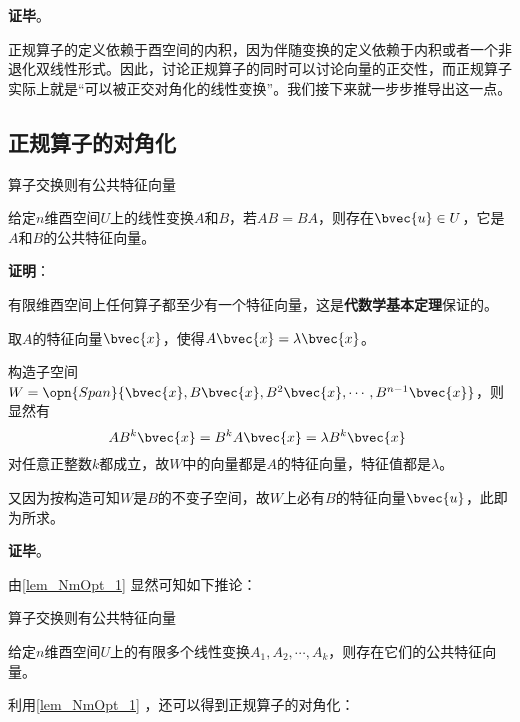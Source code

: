 \textbf{证毕}。




正规算子的定义依赖于酉空间的内积，因为伴随变换的定义依赖于内积或者一个非退化双线性形式。因此，讨论正规算子的同时可以讨论向量的正交性，而正规算子实际上就是“可以被正交对角化的线性变换”。我们接下来就一步步推导出这一点。





\subsection{正规算子的对角化}



\begin{lemma}{算子交换则有公共特征向量}\label{lem_NmOpt_1}

给定$n$维酉空间$U$上的线性变换$A$和$B$，若$AB=BA$，则存在$\bvec{u}\in U$，它是$A$和$B$的公共特征向量。

\end{lemma}


\textbf{证明}：

有限维酉空间上任何算子都至少有一个特征向量，这是\textbf{代数学基本定理}保证的。

取$A$的特征向量$\bvec{x}$，使得$A\bvec{x}=\lambda\bvec{x}$。

构造子空间$W=\opn{Span}\{\bvec{x}, B\bvec{x}, B^2\bvec{x}, \cdots, B^{n-1}\bvec{x}\}$，则显然有
\begin{equation}
AB^k\bvec{x} = B^kA\bvec{x} = \lambda B^k\bvec{x}~
\end{equation}
对任意正整数$k$都成立，故$W$中的向量都是$A$的特征向量，特征值都是$\lambda$。

又因为按构造可知$W$是$B$的不变子空间，故$W$上必有$B$的特征向量$\bvec{u}$，此即为所求。

\textbf{证毕}。



由\autoref{lem_NmOpt_1} 显然可知如下推论：

\begin{corollary}{算子交换则有公共特征向量}\label{cor_NmOpt_1}

给定$n$维酉空间$U$上的有限多个线性变换$A_1, A_2, \cdots, A_k$，则存在它们的公共特征向量。

\end{corollary}



利用\autoref{lem_NmOpt_1} ，还可以得到正规算子的对角化：


